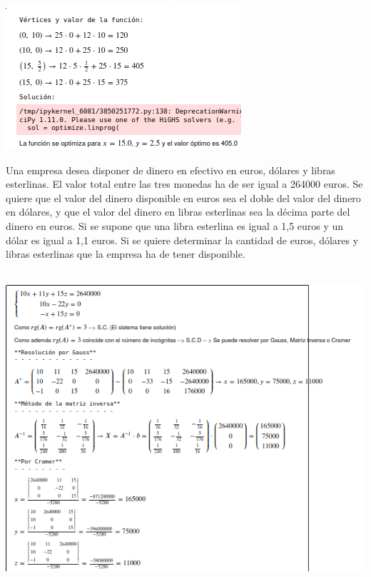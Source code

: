 \documentclass[addpoints,spanish, 12pt,a4paper]{exam}
\begin{document}
\begin{questions}
\begin{solution}
\includegraphics[scale=0.8]{prglin4}
\end{solution}

\question Una empresa desea disponer de dinero en efectivo en euros, dólares
y libras esterlinas. El valor total entre las tres monedas ha de ser igual a 264000 euros. Se quiere
que el valor del dinero disponible en euros sea el doble del valor del dinero en dólares, y que el
valor del dinero en libras esterlinas sea la décima parte del dinero en euros.
Si se supone que una libra esterlina es igual a 1,5 euros y un dólar es igual a 1,1 euros. Si se quiere
determinar la cantidad de euros, dólares y libras esterlinas que la empresa ha de tener disponible.

\begin{solution}\\
\includegraphics[scale=0.8]{sis2}
\end{solution}


\end{questions}
\end{document}
